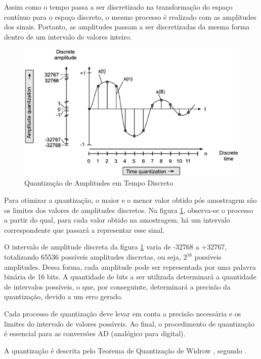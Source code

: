 Assim como o tempo passa a ser discretizado na transformação do espaço contínuo para o espaço discreto, o mesmo processo é realizado com as amplitudes dos sinais. Portanto, as amplitudes passam a ser discretizadas da mesma forma dentro de um intervalo de valores inteiro. 

\begin{figure}[h]
	\centering
    \includegraphics[scale=0.4]{figuras/fig04.eps}
	\caption{Quantização de Amplitudes em Tempo Discreto}
	\label{fig04}
\end{figure}

Para otimizar a quantização, o maior e o menor valor obtido pós amostragem são os limites dos valores de amplitudes discretos. Na figura \ref{fig04}, observa-se o processo a partir do qual, para cada valor obtido na amostragem, há um intervalo correspondente que passará a representar esse sinal. \par O intervalo de amplitude discreta da figura \ref{fig04} varia de -32768 a +32767, totalizando 65536 possíveis amplitudes discretas, ou seja, $2^{16}$ possíveis amplitudes. Dessa forma, cada amplitude pode ser representada por uma palavra binária de 16 bits. A quantidade de bits a ser utilizada determinará a quantidade de intervalos possíveis, o que, por conseguinte, determinará a precisão da quantização, devido a um erro gerado.\par Cada processo de quantização deve levar em conta a precisão necessária e os limites do intervalo de valores possíveis. Ao final, o procedimento de quantização é essencial para as conversões AD (analógico para digital).

A quantização é descrita pelo Teorema de Quantização de Widrow \cite{widrow}, segundo \cite{zolzer2008digital}.


